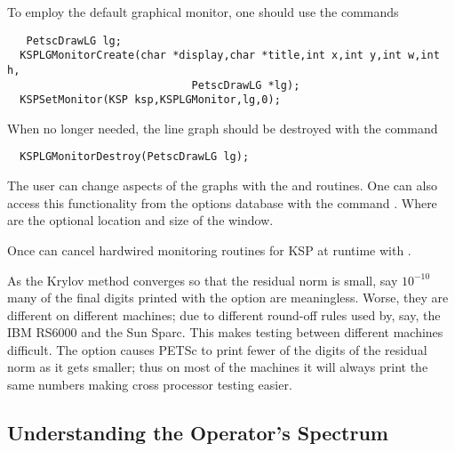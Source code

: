 To employ the default graphical monitor, one should use the 
commands  
\begin{verbatim}
   PetscDrawLG lg;
  KSPLGMonitorCreate(char *display,char *title,int x,int y,int w,int h,
                             PetscDrawLG *lg);
  KSPSetMonitor(KSP ksp,KSPLGMonitor,lg,0);
\end{verbatim}
When no longer needed, the line graph should be destroyed 
with the command
\begin{verbatim}
  KSPLGMonitorDestroy(PetscDrawLG lg);
\end{verbatim}
The user can change aspects of the graphs with the  and 
 routines.  
One can also access this functionality from the options database 
with the command  \trl{[x,y,w,h]}.  
Where  are the optional location and size of the window.

Once can cancel hardwired monitoring routines for KSP at runtime with 
. 

As the Krylov method converges so that the residual norm is small,
say $ 10^{-10} $ many of the final digits printed with the 
option are meaningless. Worse, they are different on different 
machines; due to different round-off rules used by, say, the IBM RS6000
and the Sun Sparc. This makes testing between different machines
difficult. The option  
causes PETSc to print fewer of the digits of the residual norm 
as it gets smaller; thus on most of the machines it will always
print the same numbers making cross processor testing easier.


\subsection{Understanding the Operator's Spectrum}

